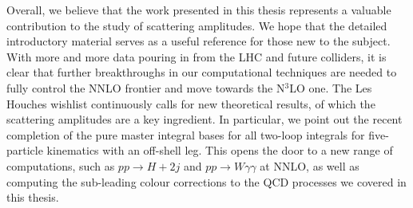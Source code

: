 \documentclass[main.tex]{subfiles}
\begin{document}
Overall, we believe that the work presented in this thesis represents a valuable contribution to the study of scattering amplitudes. We hope that the detailed introductory material serves as a useful reference for those new to the subject. With more and more data pouring in from the LHC and future colliders, it is clear that further breakthroughs in our computational techniques are needed to fully control the NNLO frontier and move towards the N$^3$LO one. The Les Houches wishlist continuously calls for new theoretical results, of which the scattering amplitudes are a key ingredient. In particular, we point out the recent completion of the pure master integral bases for all two-loop integrals for five-particle kinematics with an off-shell leg. This opens the door to a new range of computations, such as $pp \rightarrow H+2j$ and $pp \rightarrow W \gamma \gamma $ at NNLO, as well as computing the sub-leading colour corrections to the QCD processes we covered in this thesis.
\end{document}
